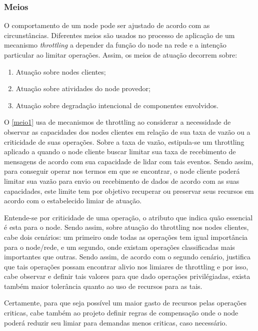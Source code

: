 \subsubsection{Meios}
\label{cap4:atuacao_meios}
O comportamento de um node pode ser ajustado de acordo com as circunstâncias. Diferentes meios são usados no processo de aplicação de um mecanismo \textit{throttling} a depender da função do node na rede e a intenção particular ao limitar operações. Assim, os meios de atuação decorrem sobre:

\begin{enumerate}[label=(\subscript{Meio} {{\arabic*}})]
	\item \label{meio1} Atuação sobre nodes clientes; 
	\item \label{meio2} Atuação sobre atividades do node provedor;
	\item \label{meio3} Atuação sobre degradação intencional de componentes envolvidos.
\end{enumerate}

O \ref{meio1} usa de mecanismos de throttling ao considerar a necessidade de observar as capacidades dos nodes clientes em relação de sua taxa de vazão ou a criticidade de suas operações. Sobre a taxa de vazão, estipula-se um throttling aplicado a quando o node cliente buscar limitar sua taxa de recebimento de mensagens de acordo com sua capacidade de lidar com tais eventos. Sendo assim, para conseguir operar nos termos em que se encontrar, o node cliente poderá limitar sua vazão para envio ou recebimento de dados de acordo com as suas capacidades, este limite tem por objetivo recuperar ou preservar seus recursos em acordo com o estabelecido limiar de atuação.

Entende-se por criticidade de uma operação, o atributo que indica quão essencial é esta para o node. Sendo assim, sobre atuação do throttling nos nodes clientes, cabe dois cenários: um primeiro onde todas as operações tem igual importância para o node/rede, e um segundo, onde existam operações classificadas mais importantes que outras. Sendo assim, de acordo com o segundo cenário, justifica que tais operações possam encontrar alivio nos  limiares de throttling  e por isso, cabe observar e definir tais valores para que dado operações privilégiadas, exista também maior tolerância quanto ao uso de recursos para as tais. 

Certamente, para que seja possível um maior gasto de recursos pelas operações criticas, cabe também ao projeto definir regras de compensação onde o node poderá reduzir seu limiar para demandas menos criticas, caso necessário.

